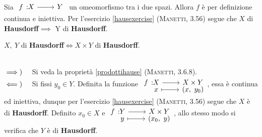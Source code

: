 \begin{demonstration}
Sia $\funz{f}{X}{Y}$ un omeomorfismo tra i due spazi. Allora $f$ è per definizione continua e iniettiva. Per l'esercizio \ref{hausexercise} \textsc{(Manetti, 3.56)} segue che $X$ di \textbf{Hausdorff}$\implies$ Y di \textbf{Hausdorff}.
\end{demonstration}
\begin{theorema}
$X,\ Y$ di \textbf{Hausdorff}$\iff X\times Y$ di \textbf{Hausdorff}.
\end{theorema}
\begin{demonstration}~{}\\
$\implies)\quad$ Si veda la proprietà \ref{prodottihause} \textsc{(Manetti, 3.6.8)}.\\
$\impliedby)\quad$ Si fissi $y_0\in Y$. Definita la funzione $\funztot{f}{X}{X\times Y}{x}{\left(x,\ y_0\right)}$, essa è continua ed iniettiva, dunque per l'esercizio \ref{hausexercise} \textsc{(Manetti, 3.56)} segue che $X$ è di \textbf{Hausdorff}. Definito $x_0\in X$ e $\funztot{f}{Y}{X\times Y}{y}{\left(x_0,\ y\right)}$, allo stesso modo si verifica che $Y$ è di \textbf{Hausdorff}.
\end{demonstration}